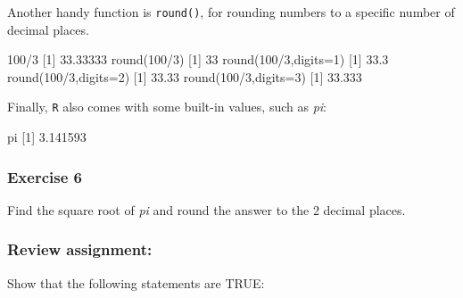 \documentclass[
]{book}
\newenvironment{Shaded}{\begin{snugshade}}{\end{snugshade}}
\newcommand{\AttributeTok}[1]{\textcolor[rgb]{0.77,0.63,0.00}{#1}}
\newcommand{\DecValTok}[1]{\textcolor[rgb]{0.00,0.00,0.81}{#1}}
\newcommand{\FloatTok}[1]{\textcolor[rgb]{0.00,0.00,0.81}{#1}}
\newcommand{\FunctionTok}[1]{\textcolor[rgb]{0.00,0.00,0.00}{#1}}
\newcommand{\NormalTok}[1]{#1}
\newcommand{\SpecialCharTok}[1]{\textcolor[rgb]{0.00,0.00,0.00}{#1}}
\begin{document}
Another handy function is \texttt{round()}, for rounding numbers to a specific number of decimal places.

\begin{Shaded}
\begin{Highlighting}[]
\DecValTok{100}\SpecialCharTok{/}\DecValTok{3}
\NormalTok{[}\DecValTok{1}\NormalTok{] }\FloatTok{33.33333}
\FunctionTok{round}\NormalTok{(}\DecValTok{100}\SpecialCharTok{/}\DecValTok{3}\NormalTok{)}
\NormalTok{[}\DecValTok{1}\NormalTok{] }\DecValTok{33}
\FunctionTok{round}\NormalTok{(}\DecValTok{100}\SpecialCharTok{/}\DecValTok{3}\NormalTok{,}\AttributeTok{digits=}\DecValTok{1}\NormalTok{)}
\NormalTok{[}\DecValTok{1}\NormalTok{] }\FloatTok{33.3}
\FunctionTok{round}\NormalTok{(}\DecValTok{100}\SpecialCharTok{/}\DecValTok{3}\NormalTok{,}\AttributeTok{digits=}\DecValTok{2}\NormalTok{)}
\NormalTok{[}\DecValTok{1}\NormalTok{] }\FloatTok{33.33}
\FunctionTok{round}\NormalTok{(}\DecValTok{100}\SpecialCharTok{/}\DecValTok{3}\NormalTok{,}\AttributeTok{digits=}\DecValTok{3}\NormalTok{)}
\NormalTok{[}\DecValTok{1}\NormalTok{] }\FloatTok{33.333}
\end{Highlighting}
\end{Shaded}

Finally, \texttt{R} also comes with some built-in values, such as \emph{pi}:

\begin{Shaded}
\begin{Highlighting}[]
\NormalTok{pi}
\NormalTok{[}\DecValTok{1}\NormalTok{] }\FloatTok{3.141593}
\end{Highlighting}
\end{Shaded}

\hypertarget{exercise-6}{%
\subsubsection*{Exercise 6}\label{exercise-6}}

Find the square root of \emph{pi} and round the answer to the 2 decimal places.

\hypertarget{review-assignment}{%
\subsubsection*{Review assignment:}\label{review-assignment}}

Show that the following statements are TRUE:
\end{document}
